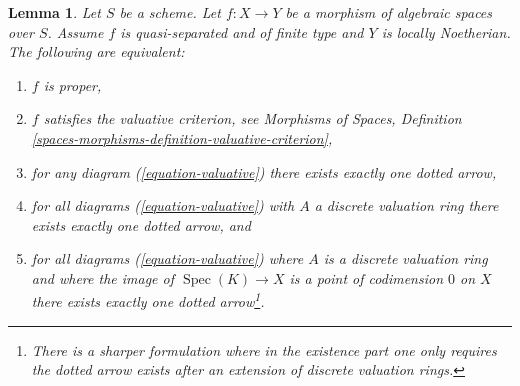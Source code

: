 \documentclass{stacks-project}
\theoremstyle{plain}
\newtheorem{lemma}[subsection]{Lemma}
\theoremstyle{definition}
\theoremstyle{remark}
\numberwithin{equation}{subsection}
\def\Spec{\mathop{\mathrm{Spec}}}
\begin{document}
\begin{lemma}
\label{lemma-Noetherian-dvr-valuative-proper}
Let $S$ be a scheme. Let $f : X \to Y$ be a morphism of algebraic spaces
over $S$. Assume $f$ is quasi-separated and of finite type and $Y$
is locally Noetherian. The following are equivalent:
\begin{enumerate}
\item $f$ is proper,
\item $f$ satisfies the valuative criterion, see
Morphisms of Spaces, Definition
\ref{spaces-morphisms-definition-valuative-criterion},
\item for any diagram (\ref{equation-valuative}) there exists exactly
one dotted arrow,
\item for all diagrams (\ref{equation-valuative}) with $A$ a discrete
valuation ring there exists exactly one dotted arrow, and
\item for all diagrams (\ref{equation-valuative}) where $A$ is a discrete
valuation ring and where the image of $\Spec(K) \to X$ is a point of
codimension $0$ on $X$ there exists exactly one dotted arrow\footnote{There is
a sharper formulation where in the existence part one only requires
the dotted arrow exists after an extension of discrete valuation rings.}.
\end{enumerate}
\end{lemma}
\end{document}
